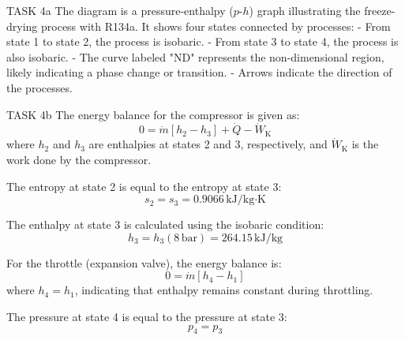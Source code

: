 TASK 4a  
The diagram is a pressure-enthalpy (\(p\)-\(h\)) graph illustrating the freeze-drying process with R134a. It shows four states connected by processes:  
- From state 1 to state 2, the process is isobaric.  
- From state 3 to state 4, the process is also isobaric.  
- The curve labeled "ND" represents the non-dimensional region, likely indicating a phase change or transition.  
- Arrows indicate the direction of the processes.  

TASK 4b  
The energy balance for the compressor is given as:  
\[
0 = \dot{m} \left[ h_2 - h_3 \right] + \dot{Q} - \dot{W}_{\text{K}}
\]  
where \(h_2\) and \(h_3\) are enthalpies at states 2 and 3, respectively, and \(\dot{W}_{\text{K}}\) is the work done by the compressor.  

The entropy at state 2 is equal to the entropy at state 3:  
\[
s_2 = s_3 = 0.9066 \, \text{kJ/kg·K}
\]  

The enthalpy at state 3 is calculated using the isobaric condition:  
\[
h_3 = h_3(8 \, \text{bar}) = 264.15 \, \text{kJ/kg}
\]  

For the throttle (expansion valve), the energy balance is:  
\[
0 = \dot{m} \left[ h_4 - h_1 \right]
\]  
where \(h_4 = h_1\), indicating that enthalpy remains constant during throttling.  

The pressure at state 4 is equal to the pressure at state 3:  
\[
p_4 = p_3
\]